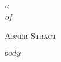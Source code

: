 \documentclass[9pt]{memoir}
\begin{document}
\frontmatter
\thispagestyle{empty}

\mbox{}\vspace{2in}
\noindent
\begin{flushright}
{\LARGE\itshape{}a}\\[2\baselineskip]
{\LARGE\itshape{}of}
\end{flushright}

\vspace{6\baselineskip}
\hfill{\Large\scshape{}Abner Stract}


\mainmatter

$body$
\end{document}
